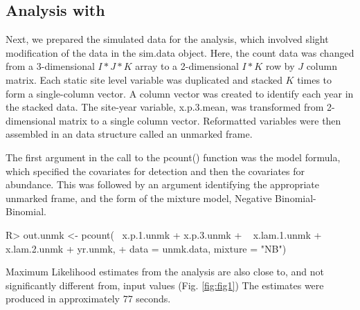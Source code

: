 \documentclass[article]{jss}
\begin{document}
\subsection[Analysis with unmarked]{Analysis with }
Next, we prepared the simulated data for the  analysis, which involved slight modification of the data in the sim.data object. Here, the count data was changed from a 3-dimensional $I*J*K$ array to a 2-dimensional $I*K$ row by $J$ column matrix.  Each static site level variable was duplicated and stacked $K$ times to form a single-column vector. A column vector was created to identify each year in the stacked data. The site-year variable, x.p.3.mean, was transformed from 2-dimensional matrix to a single column vector. Reformatted variables were then assembled in an  data structure called an unmarked frame.


The first argument in the call to the pcount() function was the model formula, which specified the covariates for detection and then the covariates for abundance. This was followed by an argument identifying the appropriate unmarked frame, and the form of the mixture model, Negative Binomial-Binomial.

\begin{CodeInput}
R> out.unmk <- pcount(~ x.p.1.unmk + x.p.3.unmk
+                     ~ x.lam.1.unmk + x.lam.2.unmk + yr.unmk,
+                       data = unmk.data, mixture = "NB")
\end{CodeInput}

Maximum Likelihood estimates from the  analysis are also close to, and not significantly different from, input values (Fig. \ref{fig:fig1})  The  estimates were produced in approximately 77 seconds.
\end{document}
